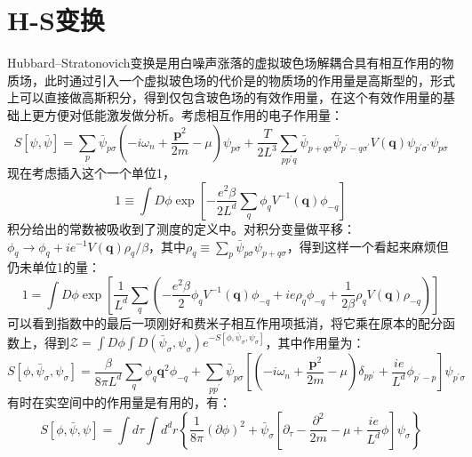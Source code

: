 \documentclass[10pt,openany]{book}
\theoremstyle{thmstyle} %
\theoremstyle{defstyle} %
\theoremstyle{prostyle} %
\begin{document}
\section{H-S变换}
Hubbard–Stratonovich变换是用白噪声涨落的虚拟玻色场解耦合具有相互作用的物质场，此时通过引入一个虚拟玻色场的代价是的物质场的作用量是高斯型的，形式上可以直接做高斯积分，得到仅包含玻色场的有效作用量，在这个有效作用量的基础上更方便对低能激发做分析。考虑相互作用的电子作用量：
\begin{equation}
  S[\psi, \bar{\psi}]=\sum_p \bar{\psi}_{p \sigma}\left(-i \omega_n+\frac{\mathbf{p}^2}{2 m}-\mu\right) \psi_{p \sigma}+\frac{T}{2 L^3} \sum_{p p^{\prime} q} \bar{\psi}_{p+q \sigma} \bar{\psi}_{p^{\prime}-q \sigma^{\prime}} V(\mathbf{q}) \psi_{p^{\prime} \sigma^{\prime}} \psi_{p \sigma}
\end{equation}
现在考虑插入这个一个单位1，
\begin{equation}
  1 \equiv \int D \phi \exp \left[-\frac{e^2 \beta}{2 L^d} \sum_q \phi_q V^{-1}(\mathbf{q}) \phi_{-q}\right]
\end{equation}
积分给出的常数被吸收到了测度的定义中。对积分变量做平移：$ \phi_q \rightarrow \phi_q+i e^{-1} V(\mathbf{q}) \rho_q / \beta $，其中$  \rho_q \equiv \sum_p \bar{\psi}_{p \sigma} \psi_{p+q \sigma}$，得到这样一个看起来麻烦但仍未单位1的量：
\begin{equation}
  1=\int D \phi \exp \left[\frac{1}{L^d} \sum_q\left(-\frac{e^2 \beta}{2} \phi_q V^{-1}(\mathbf{q}) \phi_{-q}+i e \rho_q \phi_{-q}+\frac{1}{2 \beta} \rho_q V(\mathbf{q}) \rho_{-q}\right)\right]
\end{equation}  
可以看到指数中的最后一项刚好和费米子相互作用项抵消，将它乘在原本的配分函数上，得到$ \mathcal{Z}=\int D \phi \int D\left(\bar{\psi}_\sigma, \psi_\sigma\right) e^{-S\left[\phi, \bar{\psi}_\sigma, \psi_\sigma\right]} $，其中作用量为：
\begin{equation}
  S\left[\phi, \bar{\psi}_\sigma, \psi_\sigma\right]=\frac{\beta}{8 \pi L^d} \sum_q \phi_q \mathbf{q}^2 \phi_{-q}+\sum_{p p^{\prime}} \bar{\psi}_{p \sigma}\left[\left(-i \omega_n+\frac{\mathbf{p}^2}{2 m}-\mu\right) \delta_{p p^{\prime}}+\frac{i e}{L^d} \phi_{p^{\prime}-p}\right] \psi_{p^{\prime} \sigma}
\end{equation} 
有时在实空间中的作用量是有用的，有：
\begin{equation}
  S[\phi, \bar{\psi}, \psi]=\int d \tau \int d^d r\left\{\frac{1}{8 \pi}(\partial \phi)^2+\bar{\psi}_\sigma\left[\partial_\tau-\frac{\partial^2}{2 m}-\mu+\frac{i e}{L^d} \phi\right] \psi_\sigma\right\}
\end{equation}
\end{document}
